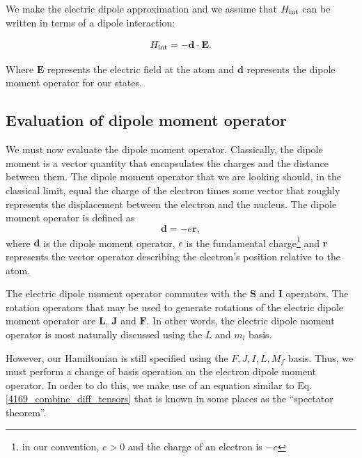 We make the electric dipole approximation and we assume that $H_\textnormal{int}$ can be written in terms of a dipole interaction:  \cite{demilleBudkerKimball}\cite{cuaMITnotes}\cite{gustavsonThesis}\cite{Young1997363}

\begin{equation}
H_\textnormal{int}=-\mathbf{d}\cdot\mathbf{E}.
\end{equation}

Where $\mathbf{E}$ represents the electric field at the atom %
and $\mathbf{d}$ represents the dipole moment operator for our states. 


\subsection{Evaluation of dipole moment operator}
We must now evaluate the dipole moment operator. 
Classically, the dipole moment is a vector quantity that encapsulates the charges and the distance between them. The dipole moment operator that we are looking should, in the classical limit, equal the charge of the electron times some vector that roughly represents the displacement between the electron and the nucleus. The dipole moment operator is defined as 
\begin{equation}
\mathbf{d}=-e\mathbf{r},
\end{equation}
where $\mathbf{d}$ is the dipole moment operator, $e$ is the fundamental charge\footnote{in our convention, $e>0$ and the charge of an electron is $-e$} and $\mathbf{r}$ represents the vector operator describing the electron's position relative to the atom\cite{demilleBudkerKimball}.

The electric dipole moment operator commutes with the $\mathbf{S}$ and $\mathbf{I}$ operators. The rotation operators that may be used to generate rotations of the electric dipole moment operator are $\mathbf{L}$, $\mathbf{J}$ and $\mathbf{F}$\cite{DeMille_presentation}. In other words, the electric dipole moment operator is most naturally discussed using the $L$ and $m_l$ basis. 

However, our Hamiltonian is still specified using the $F,J,I,L,M_f$ basis. Thus, we must perform a change of basis operation on the electron dipole moment operator. In order to do this, we make use of an equation similar to Eq.\,\ref{4169_combine_diff_tensors} that is known in some places as the ``spectator theorem''\cite{DeMille_presentation}. %

